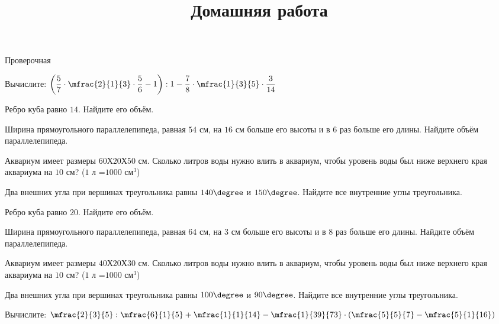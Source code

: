 \begin{exam}
	\begin{listofex}
		\item Проверочная
	\end{listofex}
\end{exam}

\begin{consultation}
	\begin{listofex}
		\item Вычислите: \quad \( \left( \dfrac{5}{7}\cdot\mfrac{2}{1}{3}\cdot\dfrac{5}{6}-1 \right):1-\dfrac{7}{8}\cdot\mfrac{1}{3}{5}\cdot\dfrac{3}{14} \)
		\item Ребро куба равно \( 14 \). Найдите его объём.
		\item Ширина прямоугольного параллелепипеда, равная \( 54 \) см, на \( 16 \) см больше его высоты и в \( 6 \) раз больше его длины. Найдите объём параллелепипеда.
		\item Аквариум имеет размеры \( 60 \)Х\( 20 \)Х\( 50 \) см. Сколько литров воды нужно влить в аквариум, чтобы уровень воды был ниже верхнего края аквариума на \( 10 \) см? (\( 1 \) л =\( 1000 \) см\( ^3 \))
		\item Два внешних угла при вершинах треугольника равны \( 140\degree \) и \( 150\degree \). Найдите все внутренние углы треугольника.
	\end{listofex}
	\newpage
	\title{Домашняя работа}
	\begin{listofex}
	\item Ребро куба равно \( 20 \). Найдите его объём.
	\item Ширина прямоугольного параллелепипеда, равная \( 64 \) см, на \( 3 \) см больше его высоты и в \( 8 \) раз больше его длины. Найдите объём параллелепипеда.
	\item Аквариум имеет размеры \( 40 \)Х\( 20 \)Х\( 30 \) см. Сколько литров воды нужно влить в аквариум, чтобы уровень воды был ниже верхнего края аквариума на \( 10 \) см? (\( 1 \) л =\( 1000 \) см\( ^3 \))
	\item Два внешних угла при вершинах треугольника равны \( 100\degree \) и \( 90\degree \). Найдите все внутренние углы треугольника.
	\item Вычислите: \quad \( \mfrac{2}{3}{5}:\mfrac{6}{1}{5}+\mfrac{1}{1}{14}-\mfrac{1}{39}{73}\cdot\left( \mfrac{5}{5}{7}-\mfrac{5}{1}{16} \right) \)
	\end{listofex}
\end{consultation}


